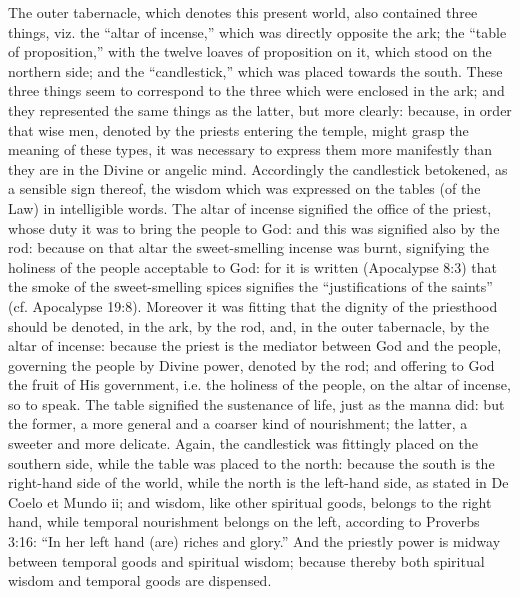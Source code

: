 The outer tabernacle, which denotes this present world, also contained three things, viz. the ``altar of incense,'' which was directly opposite the ark; the ``table of proposition,'' with the twelve loaves of proposition on it, which stood on the northern side; and the ``candlestick,'' which was placed towards the south. These three things seem to correspond to the three which were enclosed in the ark; and they represented the same things as the latter, but more clearly: because, in order that wise men, denoted by the priests entering the temple, might grasp the meaning of these types, it was necessary to express them more manifestly than they are in the Divine or angelic mind. Accordingly the candlestick betokened, as a sensible sign thereof, the wisdom which was expressed on the tables (of the Law) in intelligible words. The altar of incense signified the office of the priest, whose duty it was to bring the people to God: and this was signified also by the rod: because on that altar the sweet-smelling incense was burnt, signifying the holiness of the people acceptable to God: for it is written (Apocalypse 8:3) that the smoke of the sweet-smelling spices signifies the ``justifications of the saints'' (cf. Apocalypse 19:8). Moreover it was fitting that the dignity of the priesthood should be denoted, in the ark, by the rod, and, in the outer tabernacle, by the altar of incense: because the priest is the mediator between God and the people, governing the people by Divine power, denoted by the rod; and offering to God the fruit of His government, i.e. the holiness of the people, on the altar of incense, so to speak. The table signified the sustenance of life, just as the manna did: but the former, a more general and a coarser kind of nourishment; the latter, a sweeter and more delicate. Again, the candlestick was fittingly placed on the southern side, while the table was placed to the north: because the south is the right-hand side of the world, while the north is the left-hand side, as stated in De Coelo et Mundo ii; and wisdom, like other spiritual goods, belongs to the right hand, while temporal nourishment belongs on the left, according to Proverbs 3:16: ``In her left hand (are) riches and glory.'' And the priestly power is midway between temporal goods and spiritual wisdom; because thereby both spiritual wisdom and temporal goods are dispensed.

